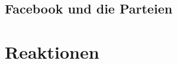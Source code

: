\documentclass[12pt, twoside = false, bibliography=totoc]{scrbook}
\begin{document}
\blindtext

\blindtext

\blindtext \parencite[vgl.][S.12]{forchtner_mediatization_2013}

\blinddocument

\section{Facebook und die Parteien}

\blindtext

\captionsetup{justification=raggedright}
 

\chapter{Reaktionen}

\blindtext


\printbibliography[title={Literaturverzeichnis}]

    
\end{document}
